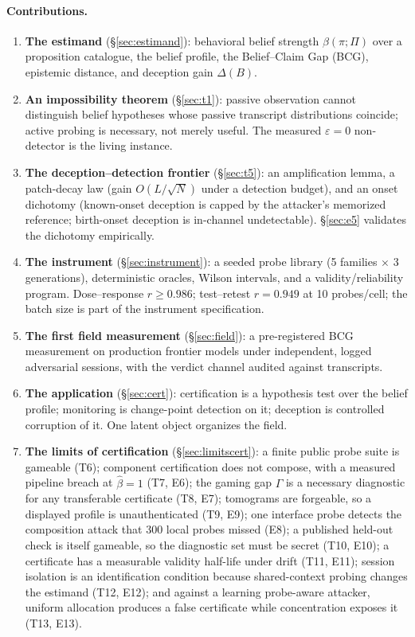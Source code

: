 \documentclass[acmsmall,review,anonymous]{acmart}
\begin{document}
\paragraph{Contributions.}
\begin{enumerate}[nosep,leftmargin=*]
\item \textbf{The estimand} (\S\ref{sec:estimand}): behavioral belief strength
$\beta(\pi;\Pi)$ over a proposition catalogue, the belief profile, the
Belief--Claim Gap (BCG), epistemic distance, and deception gain $\Delta(B)$.
\item \textbf{An impossibility theorem} (\S\ref{sec:t1}): passive observation
cannot distinguish belief hypotheses whose passive transcript distributions
coincide; active probing is necessary, not merely useful. The measured
$\varepsilon=0$ non-detector is the living instance.
\item \textbf{The deception--detection frontier} (\S\ref{sec:t5}): an
amplification lemma, a patch-decay law (gain $O(L/\sqrt N)$ under a detection
budget), and an onset dichotomy (known-onset deception is capped by the
attacker's memorized reference; birth-onset deception is in-channel
undetectable). \S\ref{sec:e5} validates the dichotomy empirically.
\item \textbf{The instrument} (\S\ref{sec:instrument}): a seeded probe library
(5 families $\times$ 3 generations), deterministic oracles, Wilson intervals, and
a validity/reliability program. Dose--response $r\ge0.986$; test--retest
$r=0.949$ at 10 probes/cell; the batch size is part of the instrument
specification.
\item \textbf{The first field measurement} (\S\ref{sec:field}): a pre-registered
BCG measurement on production frontier models under independent, logged
adversarial sessions, with the verdict channel audited against transcripts.
\item \textbf{The application} (\S\ref{sec:cert}): certification is a hypothesis
test over the belief profile; monitoring is change-point detection on it;
deception is controlled corruption of it. One latent object organizes the field.
\item \textbf{The limits of certification} (\S\ref{sec:limitscert}): a finite
public probe suite is gameable (T6); component certification does not compose,
with a measured pipeline breach at $\hat\beta=1$ (T7, E6); the gaming gap
$\Gamma$ is a necessary diagnostic for any transferable certificate (T8, E7);
tomograms are forgeable, so a displayed profile is unauthenticated (T9, E9);
one interface probe detects the composition attack that 300 local probes
missed (E8); a published held-out check is itself gameable, so the diagnostic
set must be secret (T10, E10); a certificate has a measurable validity
half-life under drift (T11, E11); session isolation is an identification
condition because shared-context probing changes the estimand (T12, E12); and
against a learning probe-aware attacker, uniform allocation produces a false
certificate while concentration exposes it (T13, E13).
\end{enumerate}
\end{document}
